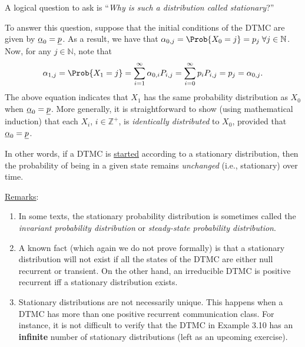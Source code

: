 \begin{Regular}
    A logical question to ask is ``\emph{Why is such a distribution called stationary}?''

    To answer this question, suppose that the initial conditions of the DTMC are given by
    $ \underline{\alpha}_0=\underline{p} $. As a result, we have that
    $ \alpha_{0,j}=\Prob{X_0=j}=p_j\;\forall j\in\mathbb{N} $. Now, for any $ j\in\mathbb{N} $,
    note that
    \[ \alpha_{1,j}=\Prob{X_1=j}=\sum_{i=1}^{\infty} \alpha_{0,i}P_{i,j}=\sum_{i=0}^{\infty} p_i P_{i,j}=p_j=\alpha_{0,j}. \]
    The above equation indicates that $ X_1 $ has the same probability distribution as $ X_0 $ when
    $ \underline{\alpha}_0=\underline{p} $. More generally, it is straightforward to show (using mathematical induction) that each
    $ X_i $, $ i\in\mathbb{Z}^+ $, is \emph{identically distributed} to $ X_0 $, provided that $ \underline{\alpha}_0=\underline{p} $.

    In other words, if a DTMC is \underline{started} according to a stationary distribution, then the
    probability of being in a given state remains \emph{unchanged} (i.e., stationary) over time.

    \tcblower{}
    \underline{Remarks}:
    \begin{enumerate}[(1)]
        \item In some texts, the stationary probability distribution is sometimes called the \emph{invariant
                  probability distribution} or \emph{steady-state probability distribution}.
        \item A known fact (which again we do not prove formally) is that a stationary distribution will
              not exist if all the states of the DTMC are either null recurrent or transient. On the other
              hand, an irreducible DTMC is positive recurrent iff a stationary distribution exists.
        \item Stationary distributions are not necessarily unique. This happens when a DTMC has more
              than one positive recurrent communication class. For instance, it is not difficult to verify
              that the DTMC in Example 3.10 has an \textbf{infinite} number of stationary distributions (left
              as an upcoming exercise).
    \end{enumerate}
\end{Regular}
